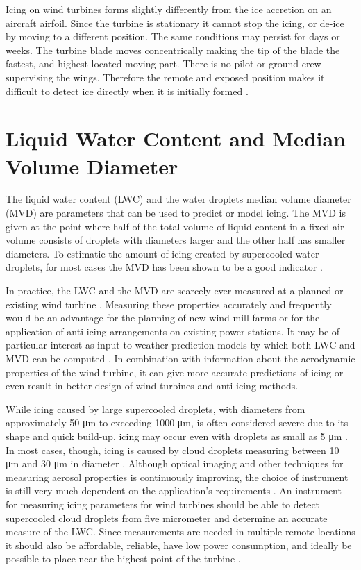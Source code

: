 Icing on wind turbines forms slightly differently from the ice accretion on an aircraft airfoil. Since the turbine is stationary it cannot stop the icing, or de-ice by moving to a different position. The same conditions may persist for days or weeks. The turbine blade moves concentrically making the tip of the blade the fastest, and highest located moving part. There is no pilot or ground crew supervising the wings. Therefore the remote and exposed position makes it difficult to detect ice directly when it is initially formed \cite{homo2006}.


\section{Liquid Water Content and Median Volume Diameter}
The liquid water content (LWC) and the water droplets median volume diameter (MVD) are parameters that can be used to predict or model icing. The  MVD is given at the point where half of the total volume of liquid content in a fixed air volume consists of droplets with diameters larger and the other half has smaller diameters. To estimatie the amount of icing created by supercooled water droplets, for most cases the MVD has been shown to be a good indicator \cite{makk1992,fins1988}.

In practice, the LWC and the MVD are scarcely ever measured at a planned or existing wind turbine \cite{parent2011, makk1992}. Measuring these properties accurately and frequently would be an advantage for the planning of new wind mill farms or for the application of anti-icing arrangements on existing power stations. It may be of particular interest as input to weather prediction models by which both LWC and MVD can be computed \cite{thomp2009, nyga2011}. In combination with information about the aerodynamic properties of the wind turbine, it can give more accurate predictions of icing or even result in better design of wind turbines and anti-icing methods.

While icing caused by large supercooled droplets, with diameters from approximately 50 μm to exceeding 1000 μm, is often considered severe due to its shape and quick build-up, icing may occur even with droplets as small as 5 μm \cite{sand1984, cob2001, homo2010}. In most cases, though, icing is caused by cloud droplets measuring between 10 μm and 30 μm in diameter \cite{makk1992, cob2001}.
Although optical imaging and other techniques for measuring aerosol properties is continuously improving, the choice of instrument is still very much dependent on the application’s requirements \cite{ide1999, baum1983, baum2011, kulk2011}. An instrument for measuring icing parameters for wind turbines should be able to detect supercooled cloud droplets from five micrometer and determine an accurate measure of the LWC. Since measurements are needed in multiple remote locations it should also be affordable, reliable, have low power consumption, and ideally be possible to place near the highest point of the turbine \cite{homo2006}.

